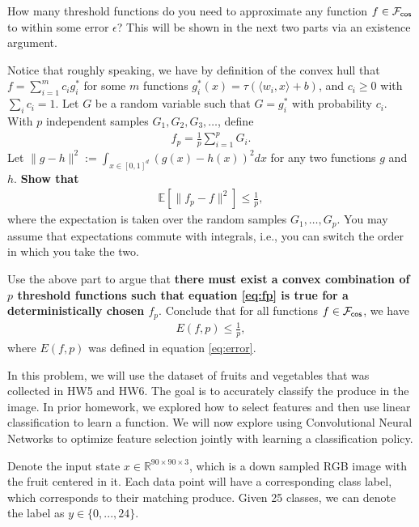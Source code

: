 \begin{Parts}
\Part How many threshold functions do you need to approximate any function $f \in \mathcal{F}_{{\sf cos}}$ to within some error $\epsilon$? This will be shown in the next two parts via an existence argument. 

Notice that roughly speaking, we have by definition of the convex hull that $f = \sum_{i = 1}^m c_i g_i^*$ for some $m$ functions $g_i^*(x) = \tau(\langle w_i, x \rangle + b)$, and $c_i \geq 0$ with $\sum_{i} c_i = 1$.
Let $G$ be a random variable such that $G = g_i^*$ with probability $c_i$. With $p$ independent samples $G_1, G_2, G_3, \ldots$, define
\begin{align*}
f_p = \frac{1}{p} \sum_{i= 1}^p G_i.
\end{align*}
Let $\|g - h\|^2 := \int_{x \in [0,1]^d } (g(x) - h(x))^2 dx$ for any two functions $g$ and $h$.
{\bf Show that}
\begin{align}
\mathbb{E} [\| f_p - f \|^2] \leq \frac{1}{p}, \label{eq:fp}
\end{align}
where the expectation is taken over the random samples $G_1, \ldots, G_p$. You may assume that expectations commute with integrals, i.e., you can switch the order in which you take the two.



\Part Use the above part to argue that {\bf there must exist a convex combination of $p$ threshold functions such that equation \eqref{eq:fp} is true for a deterministically chosen $f_p$}. Conclude that for all functions $f \in \mathcal{F}_{\sf cos}$, we have
\begin{align*}
E(f, p) \leq \frac{1}{p},
\end{align*}
where $E(f, p)$ was defined in equation \eqref{eq:error}.



\end{Parts}
In this problem, we will use the dataset of fruits and vegetables that
was collected in HW5 and HW6. The goal is to accurately classify the
produce in the image. In prior homework, we explored how to select features and then use linear classification to learn a function. We will now explore using Convolutional Neural Networks to optimize feature selection jointly with learning a classification policy.

Denote the input state $x \in \mathbb{R}^{90 \times 90 \times 3}$,
which is a down sampled RGB image with the fruit
centered in it. Each data point will have a corresponding class label,
which corresponds to their matching produce. Given 25 classes, we can
denote the label as $y \in \lbrace 0,...,24 \rbrace$.

